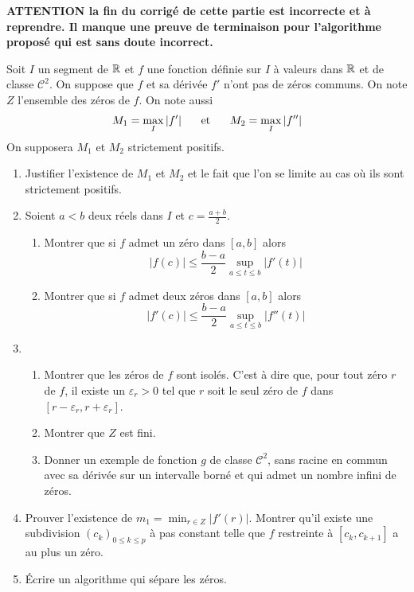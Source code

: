 \textbf{ATTENTION la fin du corrigé de cette partie est incorrecte et à reprendre. Il manque une preuve de terminaison pour l'algorithme proposé qui est sans doute incorrect.}

Soit $I$ un segment de $\mathbb{R}$ et $f$ une fonction d{\'e}finie sur $I$ {\`a} valeurs dans $\mathbb{R}$ et de classe $\mathcal{C}^2$.
On suppose que $f$ et sa d{\'e}riv{\'e}e $f'$ n'ont pas de z{\'e}ros communs. On note $Z$ l'ensemble des z{\'e}ros de $f$. On note aussi 
\begin{displaymath}
  M_1 = \max_I |f'|\hspace{0.5cm}\text{ et } \hspace{0.5cm} M_2 = \max_I |f''|
\end{displaymath}
On supposera $M_1$ et $M_2$ strictement positifs.
\begin{enumerate}
  \item Justifier l'existence de $M_1$ et $M_2$ et le fait que l'on se limite au cas où ils sont strictement positifs.

    \item Soient $a<b$ deux r{\'e}els dans $I$ et $c=\frac{a+b}{2}$.
       \begin{enumerate}
         \item Montrer que si $f$ admet un z{\'e}ro dans $[a,b]$ alors
          $$| f(c) | \leq \frac{b-a}{2} \sup_{a\leq t \leq b} | f'(t) |$$

        \item Montrer que si $f$ admet deux z{\'e}ros dans $[a,b]$ alors
          $$| f'(c) | \leq \frac{b-a}{2} \sup_{a\leq t \leq b} | f''(t) |$$
      \end{enumerate}
    \item 
    \begin{enumerate}
        \item Montrer que les z{\'e}ros de $f$ sont isol{\'e}s. C'est à dire que, pour tout z{\'e}ro $r$ de $f$, il existe un $\varepsilon _r >0$ tel que $r$ soit le seul z{\'e}ro de $f$ dans $[r-\varepsilon_r , r+\varepsilon_r ]$.
        
        \item Montrer que $Z$ est fini.

        \item Donner un exemple de fonction $g$ de classe $\mathcal{C}^2$, sans racine en commun avec sa d{\'e}riv{\'e}e sur un intervalle born{\'e} et qui admet un nombre infini de z{\'e}ros.
    \end{enumerate}

     \item Prouver l'existence de $m_1=\min_{r\in Z} |f'(r)|$. Montrer qu'il existe une subdivision $(c_k)_{0\leq k \leq p}$ {\`a} pas constant telle que $f$ restreinte {\`a} $[c_k,c_{k+1}]$ a au plus un z{\'e}ro.

    \item {\'E}crire un algorithme qui s{\'e}pare les z{\'e}ros.

\end{enumerate}
